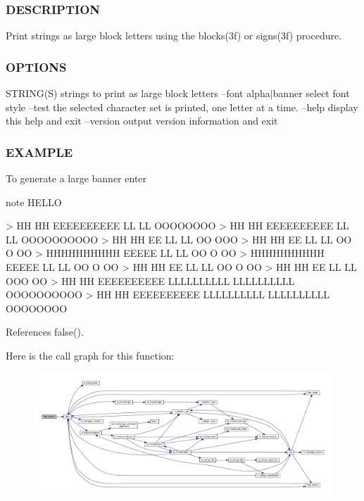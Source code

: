 \subsubsection*{D\+E\+S\+C\+R\+I\+P\+T\+I\+ON}

Print strings as large block letters using the blocks(3f) or signs(3f) procedure.

\subsubsection*{O\+P\+T\+I\+O\+NS}

S\+T\+R\+I\+N\+G(\+S) strings to print as large block letters --font alpha$\vert$banner select font style --test the selected character set is printed, one letter at a time. --help display this help and exit --version output version information and exit

\subsubsection*{E\+X\+A\+M\+P\+LE}

\begin{DoxyVerb} To generate a large banner enter

    note HELLO

    >  HH      HH  EEEEEEEEEE  LL          LL           OOOOOOOO
    >  HH      HH  EEEEEEEEEE  LL          LL          OOOOOOOOOO
    >  HH      HH  EE          LL          LL          OO     OOO
    >  HH      HH  EE          LL          LL          OO    O OO
    >  HHHHHHHHHH  EEEEE       LL          LL          OO   O  OO
    >  HHHHHHHHHH  EEEEE       LL          LL          OO  O   OO
    >  HH      HH  EE          LL          LL          OO O    OO
    >  HH      HH  EE          LL          LL          OOO     OO
    >  HH      HH  EEEEEEEEEE  LLLLLLLLLL  LLLLLLLLLL  OOOOOOOOOO
    >  HH      HH  EEEEEEEEEE  LLLLLLLLLL  LLLLLLLLLL   OOOOOOOO \end{DoxyVerb}
 

References false().

Here is the call graph for this function\+:
\nopagebreak
\begin{figure}[H]
\begin{center}
\leavevmode
\includegraphics[width=350pt]{note_8f90_a39c21619b08a3c22f19e2306efd7f766_cgraph}
\end{center}
\end{figure}
